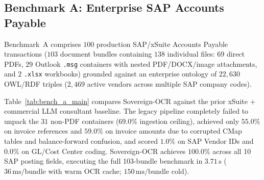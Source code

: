 \documentclass[10pt,twocolumn,letterpaper]{article}
\begin{document}
\begin{table}[t]
\centering
\caption{Ablation Study on Benchmark A ($N=100$ SAP AP invoices), quantifying the exact contribution of each Sovereign-OCR stage to end-to-end bundle accuracy.}
\label{tab:bench_a_ablation}
\vspace{-0.5em}
\end{table}

\subsection{Benchmark A: Enterprise SAP Accounts Payable}

Benchmark~A comprises $100$ production SAP/xSuite Accounts Payable transactions ($103$ document bundles containing $138$ individual files: $69$ direct PDFs, $29$ Outlook \texttt{.msg} containers with nested PDF/DOCX/image attachments, and $2$ \texttt{.xlsx} workbooks) grounded against an enterprise ontology of $22,630$ OWL/RDF triples ($2,469$ active vendors across multiple SAP company codes).

Table~\ref{tab:bench_a_main} compares Sovereign-OCR against the prior xSuite + commercial LLM consultant baseline. The legacy pipeline completely failed to unpack the $31$ non-PDF containers ($69.0\%$ ingestion ceiling), achieved only $55.0\%$ on invoice references and $59.0\%$ on invoice amounts due to corrupted CMap tables and balance-forward confusion, and scored $1.0\%$ on SAP Vendor IDs and $0.0\%$ on GL/Cost Center coding. Sovereign-OCR achieves $\mathbf{100.0\%}$ across all 10 SAP posting fields, executing the full 103-bundle benchmark in $3.71\,\text{s}$ ($36\,\text{ms/bundle}$ with warm OCR cache; $150\,\text{ms/bundle}$ cold).
\end{document}
